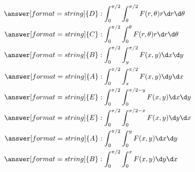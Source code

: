 \documentclass{ximera}
\begin{document}
\begin{exercise}
  \begin{align*}
    \answer[format=string]{D}&: \int_0^{\pi/2} \int_{\theta}^{\pi/2}F(r,\theta)r \d r\d\theta \\
    \answer[format=string]{C}&: \int_0^{\pi/2} \int_0^{\theta}F(r,\theta)r \d r\d \theta \\
    \answer[format=string]{B}&: \int_0^{\pi/2} \int_{y}^{\pi/2}F(x,y) \d x\d y\\ 
    \answer[format=string]{A}&: \int_0^{\pi/2} \int_{x}^{\pi/2}F(x,y) \d y\d x\\
    \answer[format=string]{E}&: \int_0^{\pi/2} \int_{0}^{\pi/2-y}F(x,y) \d x\d y\\
    \answer[format=string]{E}&: \int_0^{\pi/2} \int_{0}^{\pi/2-x}F(x,y) \d y\d x\\
    \answer[format=string]{A}&: \int_0^{\pi/2} \int_{0}^{y}F(x,y) \d x\d y\\
    \answer[format=string]{B}&: \int_0^{\pi/2} \int_{0}^{x}F(x,y) \d y\d x
  \end{align*}

\end{exercise}
\end{document}
